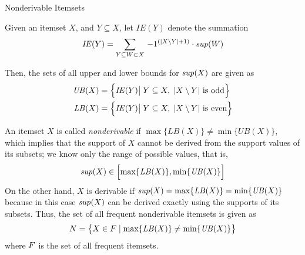 \begin{frame}{Nonderivable Itemsets}

  \small
  Given an itemset $X$, and $Y \subseteq X$, let $\mathit{IE}(Y)$ denote the
summation
\begin{align*}
  \mathit{IE}(Y) = \sum_{Y \subseteq W \subset X}\, -1^{\left(|X\setminus
Y|+1\right)} \cdot \mathit{sup}(W)
\end{align*}

\medskip
Then, the sets of all upper and lower bounds for
$\mathit{sup}(X)$ are given as
\begin{align*}
  \mathit{UB}(X) & = \Bigl\{\mathit{IE}(Y) \big|\; Y \subseteq X,\; |X\setminus Y|
  \text{ is odd} \Bigr\}\\
  \mathit{LB}(X) & = \Bigl\{\mathit{IE}(Y) \big|\; Y \subseteq X,\; |X\setminus Y|
  \text{ is even} \Bigr\}
\end{align*}

\bigskip
An itemset $X$ is called {\em nonderivable} if $\max\{\mathit{LB}(X)\} \ne
\min\{\mathit{UB}(X)\}$,
which implies that the support of $X$ cannot be derived from the
support values of its subsets;
we know only the range of possible values, that is,
$$\mathit{sup}(X) \in \Bigl[  \max\{\mathit{LB}(X)\}, \min\{\mathit{UB}(X)\} \Bigr]$$
On the other hand, $X$ is derivable if
$\mathit{sup}(X) = \max\{\mathit{LB}(X)\} = \min\{\mathit{UB}(X)\}$
because in this case $\mathit{sup}(X)$
can be derived exactly using the supports of its subsets.
Thus, the set of all frequent nonderivable itemsets is given as
\begin{align*}
  {\relax N} = \bigl\{X \in {\relax F} \mid \max\{\mathit{LB}(X)\} \ne \min\{\mathit{UB}(X)\}\bigr\}
\end{align*}
where ${\relax F}$ is the set of all frequent itemsets.
\end{frame}

%

